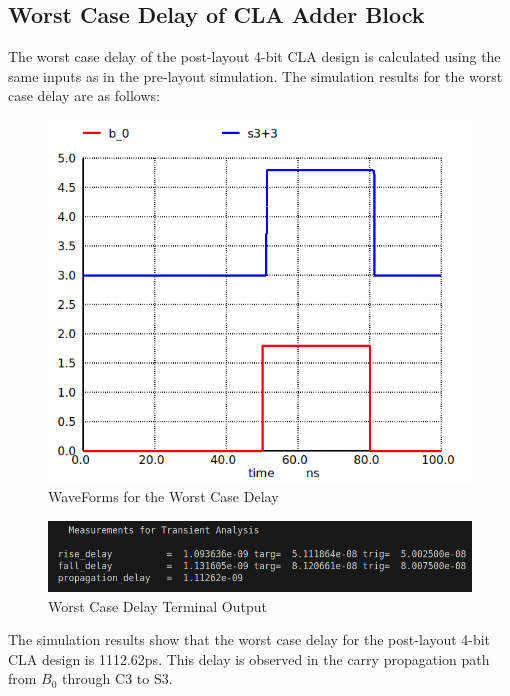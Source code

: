 \documentclass[conference]{IEEEtran}
\begin{document}
\subsection{Worst Case Delay of CLA Adder Block}
The worst case delay of the post-layout 4-bit CLA design is calculated using the same inputs as in the pre-layout simulation. The simulation results for the worst case delay are as follows:

\begin{figure}[H]
    \centering
    \includegraphics[width=1\linewidth]{clapostworst.png}
    \caption{WaveForms for the Worst Case Delay}
    \label{fig:worst_case_delay}
\end{figure}

\begin{figure}[H]
    \centering
    \includegraphics[width=1\linewidth]{clapostworstterm.png}
    \caption{Worst Case Delay Terminal Output}
    \label{fig:worst_case_delay}
\end{figure}

The simulation results show that the worst case delay for the post-layout 4-bit CLA design is 1112.62ps. This delay is observed in the carry propagation path from $B_0$ through C3 to S3.
\end{document}
